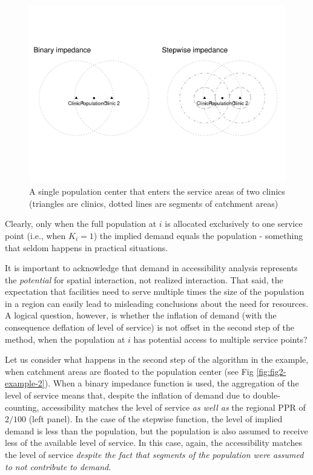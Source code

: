 \documentclass[10pt,letterpaper]{article}
\begin{document}
\begin{figure}
\includegraphics[width=0.95\linewidth]{Supply_and_Demand_Inflation_in_FCA_Methods_v2.0_files/figure-latex/fig1-example-1-1} \caption{\label{fig:fig1-example-1}A single population center that enters the service areas of two clinics (triangles are clinics, dotted lines are segments of catchment areas)}\label{fig:fig1-example-1}
\end{figure}

Clearly, only when the full population at \(i\) is allocated exclusively
to one service point (i.e., when \(K_i=1\)) the implied demand equals
the population - something that seldom happens in practical situations.

It is important to acknowledge that demand in accessibility analysis
represents the \emph{potential} for spatial interaction, not realized
interaction. That said, the expectation that facilities need to serve
multiple times the size of the population in a region can easily lead to
misleading conclusions about the need for resources. A logical question,
however, is whether the inflation of demand (with the consequence
deflation of level of service) is not offset in the second step of the
method, when the population at \(i\) has potential access to multiple
service points?

Let us consider what happens in the second step of the algorithm in the
example, when catchment areas are floated to the population center (see
Fig \ref{fig:fig2-example-2}). When a binary impedance function is used,
the aggregation of the level of service means that, despite the
inflation of demand due to double-counting, accessibility matches the
level of service \emph{as well as} the regional PPR of \(2/100\) (left
panel). In the case of the stepwise function, the level of implied
demand is less than the population, but the population is also assumed
to receive less of the available level of service. In this case, again,
the accessibility matches the level of service \emph{despite the fact
that segments of the population were assumed to not contribute to
demand}.
\end{document}
